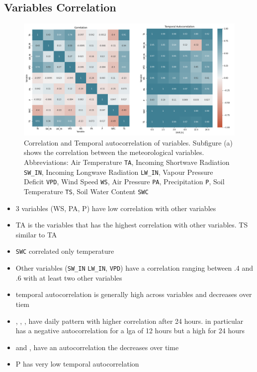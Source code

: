 \documentclass{article}
\let\Oldsubsection\subsection
\renewcommand{\subsection}{\FloatBarrier\Oldsubsection}
\begin{document}
\subsection{Variables Correlation}

\begin{figure}
    \centerline{\includegraphics[width=7in]{correlation}}
    \caption{Correlation and Temporal autocorrelation of variables. Subfigure (a) shows the correlation between the meteorological variables. Abbreviations: Air Temperature \texttt{TA}, Incoming Shortwave Radiation \texttt{SW\_IN}, Incoming Longwave Radiation \texttt{LW\_IN}, Vapour Pressure Deficit \texttt{VPD}, Wind Speed \texttt{WS}, Air Pressure \texttt{PA}, Precipitation \texttt{P}, Soil Temperature \texttt{TS}, Soil Water Content \texttt{SWC}}
    \label{fig:correlation}
\end{figure}

\begin{itemize}
    \item 3 variables (WS, PA, P) have low correlation with other variables
    \item TA is the variables that has the highest correlation with other variables. TS similar to TA
    \item \texttt{SWC} correlated only temperature
    \item Other variables (\texttt{SW\_IN} \texttt{LW\_IN}, \texttt{VPD}) have a correlation ranging between .4 and .6 with at least two other variables
    \item temporal autocorrelation is generally high across variables and decreases over tiem 
    \item {}, , ,  have daily pattern with higher correlation after 24 hours. in particular  has a negative autocorrelation for a lga of 12 hours but a high for 24 hours 
    \item {} and ,  have an autocorrelation the decreases over time
    \item P has very low temporal autocorrelation
\end{itemize}
\end{document}
